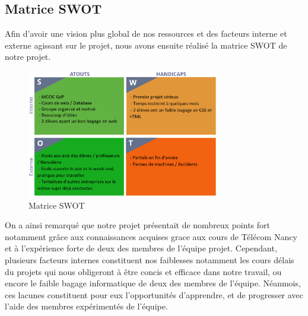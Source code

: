 \documentclass[french,a4paper]{article}
\begin{document}
\subsection{Matrice SWOT}
Afin d’avoir une vision plus global de nos ressources et des facteurs interne et externe agissant sur le projet, nous avons ensuite réalisé la matrice SWOT de notre projet. 

\begin{figure}[H]
    \centering
    \includegraphics[width=0.75\textwidth]{img/SWOT.png}
    \caption{Matrice SWOT}
\end{figure} 

On a ainsi remarqué que notre projet présentait de nombreux points fort notamment grâce aux connaissances acquises grace aux cours de Télécom Nancy et à l’expérience forte de deux des membres de l’équipe projet.  Cependant, plusieurs facteurs internes constituent nos faiblesses notamment les cours délais du projets qui nous obligeront à être concis et efficace dans notre travail, ou encore le faible bagage informatique de deux des membres de l’équipe. Néanmois, ces lacunes constituent pour eux l’opportunités d’apprendre, et de progresser avec l’aide des membres expérimentés de l’équipe. 
\end{document}
